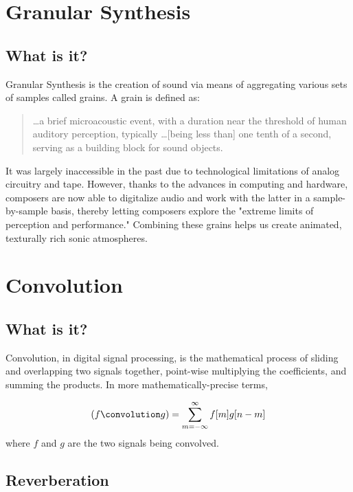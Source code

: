 \documentclass{article}
\begin{document}
	\section{Granular Synthesis}
		\subsection{What is it?}
			Granular Synthesis is the creation of sound via means of aggregating various sets of samples called grains. A grain is defined as:
			\begin{quote} 
				\ldots a brief microacoustic event, with a duration near the threshold of human auditory perception, typically \ldots [being less than] one tenth of a second, serving as a building block for sound objects.\cite[Loc. 1024]{Curtis_gs_def} 
			\end{quote}

			It was largely inaccessible in the past due to technological limitations of analog circuitry and tape. However, thanks to the advances in computing and hardware, composers are now able to digitalize audio and work with the latter in a sample-by-sample basis, thereby letting composers explore the "extreme limits of perception and performance."\cite[Loc. 334]{Curtis_gs}  Combining these grains helps us create animated, texturally rich sonic atmospheres.\cite[Loc. 1024]{Curtis_gs_def}    
			
	\section{Convolution}
		\subsection{What is it?}
			Convolution, in digital signal processing, is the mathematical process of sliding and overlapping two signals together, point-wise multiplying the coefficients, and summing the products. In more mathematically-precise terms, 

		\begin{equation}
			(f \convolution g) = \sum_{m=-\infty}^{\infty} f[m] g[n-m] 
		\end{equation} 
		where $f$ and $g$ are the two signals being convolved.\cite[pp. 121]{JOS_conv}  

		\subsection{Reverberation}
\end{document}
